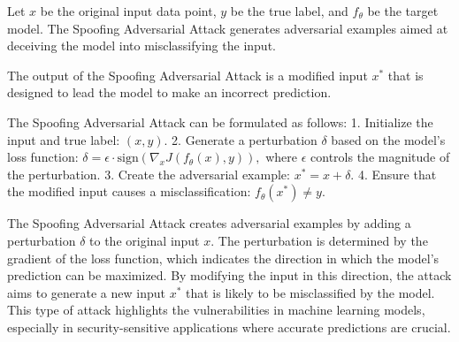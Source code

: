 Let \( x \) be the original input data point, \( y \) be the true label, and \( f_{\theta} \) be the target model. The Spoofing Adversarial Attack generates adversarial examples aimed at deceiving the model into misclassifying the input.

The output of the Spoofing Adversarial Attack is a modified input \( x^* \) that is designed to lead the model to make an incorrect prediction.

The Spoofing Adversarial Attack can be formulated as follows:
1. Initialize the input and true label:
   $
   (x, y).
   $
2. Generate a perturbation \( \delta \) based on the model's loss function:
   $
   \delta = \epsilon \cdot \text{sign}(\nabla_x J(f_{\theta}(x), y)),
   $
   where \( \epsilon \) controls the magnitude of the perturbation.
3. Create the adversarial example:
   $
   x^* = x + \delta.
   $
4. Ensure that the modified input causes a misclassification:
   $
   f_{\theta}(x^*) \neq y.
   $

The Spoofing Adversarial Attack creates adversarial examples by adding a perturbation \( \delta \) to the original input \( x \). The perturbation is determined by the gradient of the loss function, which indicates the direction in which the model's prediction can be maximized. By modifying the input in this direction, the attack aims to generate a new input \( x^* \) that is likely to be misclassified by the model. This type of attack highlights the vulnerabilities in machine learning models, especially in security-sensitive applications where accurate predictions are crucial.
